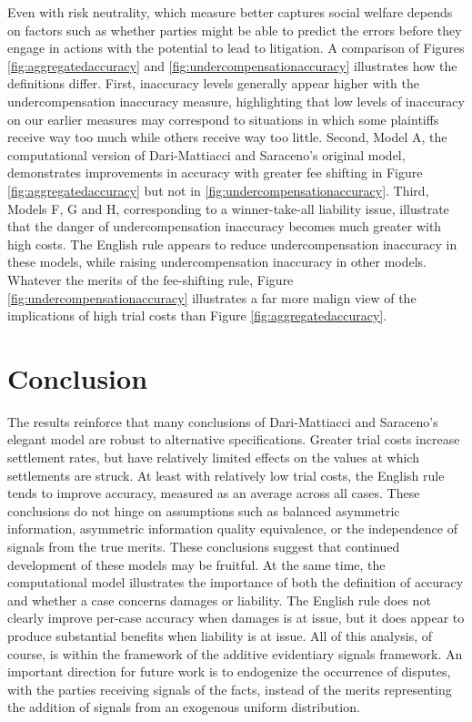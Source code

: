 \documentclass{article}
\begin{document}
Even with risk neutrality, which measure better captures social welfare depends on factors such as whether parties might be able to predict the errors before they engage in actions with the potential to lead to litigation. A comparison of Figures \ref{fig:aggregatedaccuracy} and \ref{fig:undercompensationaccuracy} illustrates how the definitions differ. First, inaccuracy levels generally appear higher with the undercompensation inaccuracy measure, highlighting that low levels of inaccuracy on our earlier measures may correspond to situations in which some plaintiffs receive way too much while others receive way too little. Second, Model A, the computational version of Dari-Mattiacci and Saraceno's original model, demonstrates improvements in accuracy with greater fee shifting in Figure \ref{fig:aggregatedaccuracy} but not in \ref{fig:undercompensationaccuracy}. Third, Models F, G and H, corresponding to a winner-take-all liability issue, illustrate that the danger of undercompensation inaccuracy becomes much greater with high costs. The English rule appears to reduce undercompensation inaccuracy in these models, while raising undercompensation inaccuracy in other models. Whatever the merits of the fee-shifting rule, Figure \ref{fig:undercompensationaccuracy} illustrates a far more malign view of the implications of high trial costs than Figure \ref{fig:aggregatedaccuracy}.

\section{Conclusion}

The results reinforce that many conclusions of Dari-Mattiacci and Saraceno's elegant model are robust to alternative specifications. Greater trial costs increase settlement rates, but have relatively limited effects on the values at which settlements are struck. At least with relatively low trial costs, the English rule tends to improve accuracy, measured as an average across all cases. These conclusions do not hinge on assumptions such as balanced asymmetric information, asymmetric information quality equivalence, or the independence of signals from the true merits. These conclusions suggest that continued development of these models may be fruitful. At the same time, the computational model illustrates the importance of both the definition of accuracy and whether a case concerns damages or liability. The English rule does not clearly improve per-case accuracy when damages is at issue, but it does appear to produce substantial benefits when liability is at issue. All of this analysis, of course, is within the framework of the additive evidentiary signals framework. An important direction for future work is to endogenize the occurrence of disputes, with the parties receiving signals of the facts, instead of the merits representing the addition of signals from an exogenous uniform distribution.

\printbibliography
\end{document}
